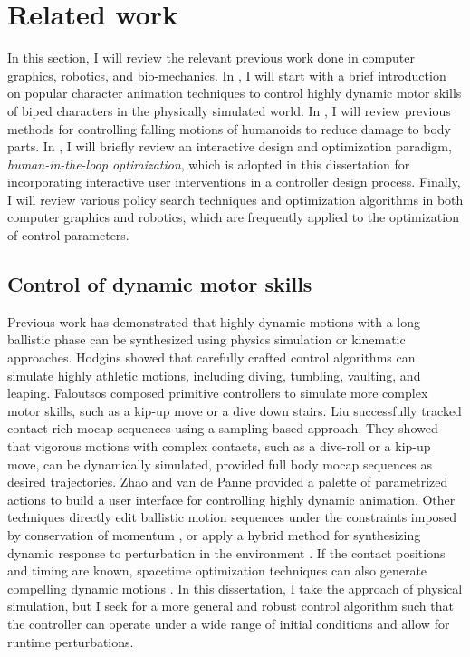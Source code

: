 \chapter{Related work}

In this section, I will review the relevant previous work done in 
computer graphics, robotics, and bio-mechanics.
In , I will start with a brief introduction on
popular character animation techniques to control highly dynamic motor skills
of biped characters in the physically simulated world.
In , I will review previous methods for controlling
falling motions of humanoids to reduce damage to body parts.
In , I will briefly review an interactive design and 
optimization paradigm, \emph{human-in-the-loop optimization}, which is
adopted in this dissertation for incorporating interactive user interventions
in a controller design process.
Finally, I will review various policy search techniques and optimization
algorithms in both computer graphics and robotics, which are frequently
applied to the optimization of control parameters.

\section{Control of dynamic motor skills}
\label{sec:related_dynamic}

Previous work has demonstrated that highly
dynamic motions with a long ballistic phase can be synthesized using
physics simulation or kinematic approaches. Hodgins \etal
\cite{Hodgins:1995:AHA,Wooten:1998:Phd} showed that carefully
crafted control algorithms can simulate highly athletic motions,
including diving, tumbling, vaulting, and leaping. Faloutsos \etal
\cite{Faloutsos:2001:CCF} composed primitive controllers to
simulate more complex motor skills, such as a kip-up move or a dive
down stairs. Liu \etal \cite{Liu:2010:SCM} successfully tracked
contact-rich mocap sequences using a sampling-based approach. They
showed that vigorous motions with complex contacts, such as a
dive-roll or a kip-up move, can be dynamically simulated, provided
full body mocap sequences as desired trajectories. Zhao and van de
Panne \cite{Zhao:2005:UII} provided a palette of parametrized
actions to build a user interface for controlling highly dynamic
animation.  Other techniques directly edit ballistic motion sequences
under the constraints imposed by conservation of momentum
\cite{Majkowska:2007:FPM,Sok:2010:EDH}, or apply a hybrid method for
synthesizing dynamic response to perturbation in the environment
\cite{Shapiro:2003:HCI}.  If the contact positions and timing are
known, spacetime optimization techniques can also generate compelling
dynamic motions
\cite{Liu:2002:SCD,Fang:2003:ESP,Safonova:2004:SPR,Sulejmanpavic:2004:APB}.
In this dissertation, I take the approach of physical simulation, 
but I seek for a more general and robust control algorithm such that the
controller can operate under a wide range of initial conditions and
allow for runtime perturbations. 

